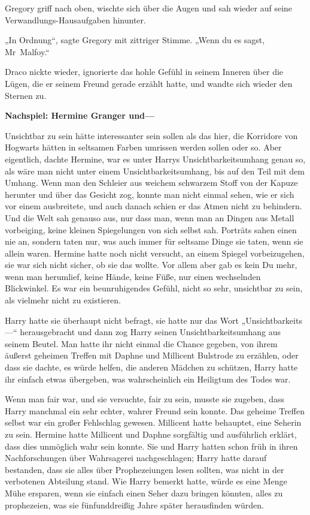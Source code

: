{Gregory griff nach oben, wischte sich über die Augen und sah wieder auf seine Verwandlungs-Hausaufgaben hinunter.

„In Ordnung“, sagte Gregory mit zittriger Stimme. „Wenn du es sagst, Mr~Malfoy.“

Draco nickte wieder, ignorierte das hohle Gefühl in seinem Inneren über die Lügen, die er seinem Freund gerade erzählt hatte, und wandte sich wieder den Sternen zu.

\textbf{Nachspiel: Hermine Granger und—}

Unsichtbar zu sein hätte interessanter sein sollen als das hier, die Korridore von Hogwarts hätten in seltsamen Farben umrissen werden sollen oder so. Aber eigentlich, dachte Hermine, war es unter Harrys Unsichtbarkeitsumhang genau so, als wäre man nicht unter einem Unsichtbarkeitsumhang, bis auf den Teil mit dem Umhang. Wenn man den Schleier aus weichem schwarzem Stoff von der Kapuze herunter und über das Gesicht zog, konnte man nicht einmal sehen, wie er sich vor einem ausbreitete, und auch danach schien er das Atmen nicht zu behindern. Und die Welt sah genauso aus, nur dass man, wenn man an Dingen aus Metall vorbeiging, keine kleinen Spiegelungen von sich selbst sah. Porträts sahen einen nie an, sondern taten nur, was auch immer für seltsame Dinge sie taten, wenn sie allein waren. Hermine hatte noch nicht versucht, an einem Spiegel vorbeizugehen, sie war sich nicht sicher, ob sie das wollte. Vor allem aber gab es kein Du mehr, wenn man herumlief, keine Hände, keine Füße, nur einen wechselnden Blickwinkel. Es war ein beunruhigendes Gefühl, nicht so sehr, unsichtbar zu sein, als vielmehr nicht zu existieren.

Harry hatte sie überhaupt nicht befragt, sie hatte nur das Wort „Unsichtbarkeits—“ herausgebracht und dann zog Harry seinen Unsichtbarkeitsumhang aus seinem Beutel. Man hatte ihr nicht einmal die Chance gegeben, von ihrem äußerst geheimen Treffen mit Daphne und Millicent Bulstrode zu erzählen, oder dass sie dachte, es würde helfen, die anderen Mädchen zu schützen, Harry hatte ihr einfach etwas übergeben, was wahrscheinlich ein Heiligtum des Todes war.

Wenn man fair war, und sie versuchte, fair zu sein, musste sie zugeben, dass Harry manchmal ein sehr echter, wahrer Freund sein konnte. Das geheime Treffen selbst war ein großer Fehlschlag gewesen. Millicent hatte behauptet, eine Seherin zu sein. Hermine hatte Millicent und Daphne sorgfältig und ausführlich erklärt, dass dies unmöglich wahr sein konnte. Sie und Harry hatten schon früh in ihren Nachforschungen über Wahrsagerei nachgeschlagen; Harry hatte darauf bestanden, dass sie alles über Prophezeiungen lesen sollten, was nicht in der verbotenen Abteilung stand. Wie Harry bemerkt hatte, würde es eine Menge Mühe ersparen, wenn sie einfach einen Seher dazu bringen könnten, alles zu prophezeien, was sie fünfunddreißig Jahre später herausfinden würden.

}
